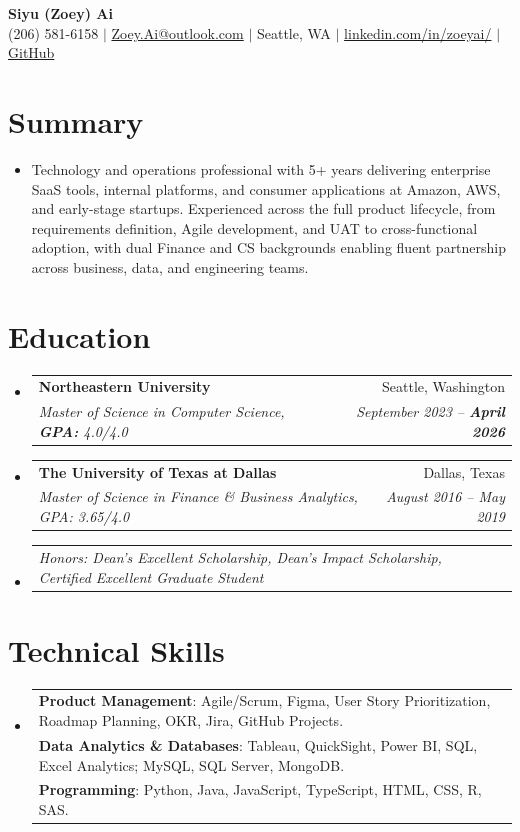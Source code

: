 \documentclass[letterpaper,10pt]{article}
\makeatletter
\newcommand{\resumeSubheading}[4]{
  \vspace{-2pt}\item
  \begin{tabular*}{0.97\textwidth}[t]{l@{\extracolsep{\fill}}r}
    \textbf{#1} & #2 \\
    \textit{\small#3} & \textit{\small #4} \\
  \end{tabular*}\vspace{-9pt}}
\newcommand{\resumeSubSubheading}[2]{
  \item\begin{tabular*}{0.97\textwidth}{l@{\extracolsep{\fill}}r}
    \textit{\small#1} & \textit{\small #2} \\
  \end{tabular*}\vspace{-7pt}}
\newcommand{\resumeSubHeadingListStart}{\begin{itemize}[leftmargin=0.15in,label={}]}
\newcommand{\resumeSubHeadingListEnd}{\end{itemize}}
\makeatother
\begin{document}
\begin{center}
  {\LARGE \textbf{Siyu (Zoey) Ai}} \\[3pt]
  \small
  (206) 581-6158 $\mid$
  \href{mailto:Zoey.Ai@outlook.com}{Zoey.Ai@outlook.com} $\mid$
  Seattle, WA $\mid$
  \href{https://www.linkedin.com/in/zoeyai/}{linkedin.com/in/zoeyai/} $\mid$
  \href{https://github.com/zoeyai1221}{GitHub}
\end{center}

\section{Summary}
\resumeSubHeadingListStart
  \item\small{Technology and operations professional with 5+ years delivering enterprise SaaS tools, internal platforms, and consumer applications at Amazon, AWS, and early-stage startups. Experienced across the full product lifecycle, from requirements definition, Agile development, and UAT to cross-functional adoption, with dual Finance and CS backgrounds enabling fluent partnership across business, data, and engineering teams.
}
\resumeSubHeadingListEnd

\vspace{-10pt}

\section{Education}
\resumeSubHeadingListStart
  \resumeSubheading{Northeastern University}{Seattle, Washington}{Master of Science in Computer Science, \textbf{ GPA:} 4.0/4.0}{September 2023 -- \textbf{April 2026}}
  \resumeSubheading{The University of Texas at Dallas}{Dallas, Texas}{Master of Science in Finance \& Business Analytics, GPA: 3.65/4.0}{August 2016 -- May 2019}
  \resumeSubSubheading{Honors: Dean's Excellent Scholarship, Dean's Impact Scholarship, Certified Excellent Graduate Student}{}
\resumeSubHeadingListEnd

\section{Technical Skills}
\resumeSubHeadingListStart
  \item\small{\begin{tabular*}{0.97\textwidth}{p{}}
      \textbf{Product Management}: {Agile/Scrum, Figma, User Story Prioritization, Roadmap Planning, OKR, Jira, GitHub Projects.} \\
      \textbf{Data Analytics \& Databases}: {Tableau, QuickSight, Power BI, SQL, Excel Analytics; MySQL, SQL Server, MongoDB.} \\
      \textbf{Programming}: {Python, Java, JavaScript, TypeScript, HTML, CSS, R, SAS.} \\
  \end{tabular*}}
\resumeSubHeadingListEnd
\end{document}
